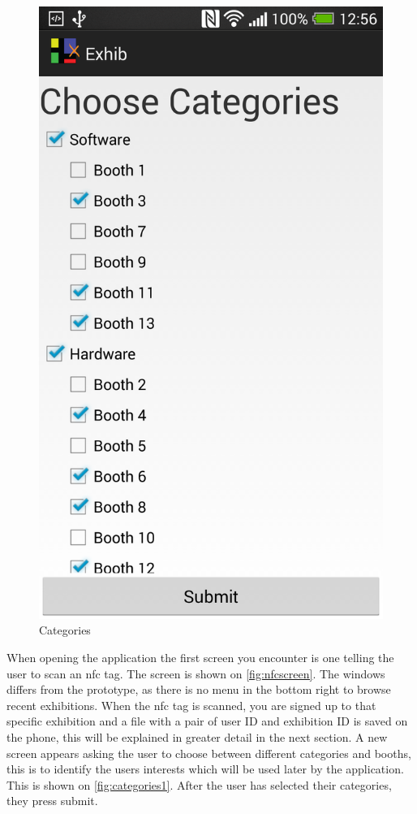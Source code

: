 \begin{figure}[H]
\begin{minipage}[b]{0.5\columnwidth}
\includegraphics[width=0.7\columnwidth]{img/finaldesign/categories.png}
\caption{Categories}
\label{fig:categories1}
\end{minipage}
\end{figure}

When opening the application the first screen you encounter is one telling the user to scan an \ac{nfc} tag. The screen is shown on \autoref{fig:nfcscreen}. The windows differs from the prototype, as there is no menu in the bottom right to browse recent exhibitions. When the \ac{nfc} tag is scanned, you are signed up to that specific exhibition and a file with a pair of user ID and exhibition ID is saved on the phone, this will be explained in greater detail in the next section. A new screen appears asking the user to choose between different categories and booths, this is to identify the users interests which will be used later by the application. This is shown on \autoref{fig:categories1}. After the user has selected their categories, they press submit. 


